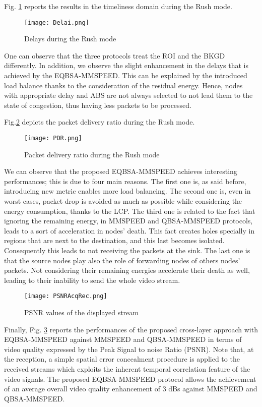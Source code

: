 \documentclass[conference,a4paper]{IEEEtran}
\begin{document}
Fig. \ref{D_RM} reports the results in the timeliness domain during the Rush mode. 
\begin{figure}[htb]
\centering \texttt{[image: Delai.png]}
\caption{Delays during the Rush mode}
\label{D_RM}
\end{figure}
One can observe that the three protocols treat the ROI and the BKGD differently. In addition, we observe the slight enhancement in the delays that is achieved by the EQBSA-MMSPEED. This can be explained by the introduced load balance thanks to the consideration of the residual energy. Hence, nodes with appropriate delay and ABS are not always selected to not lead them to the state of congestion, thus having less packets to be processed.  

Fig.\ref{PDR_RM} depicts the packet delivery ratio during the Rush mode.
\begin{figure}[htb]
\centering \texttt{[image: PDR.png]}
\caption{Packet delivery ratio during the Rush mode}
\label{PDR_RM}
\end{figure}
We can observe that the proposed EQBSA-MMSPEED achieves interesting performances; this is due to four main reasons. The first one is, as said before, introducing new metric enables more load balancing. The second one is, even in worst cases, packet drop is avoided as much as possible while considering the energy consumption, thanks to the LCP. The third one is related to the fact that ignoring the remaining energy, in MMSPEED and QBSA-MMSPEED protocols, leads to a sort of acceleration in nodes' death. This fact creates holes specially in regions that are next to the destination, and this last becomes isolated. Consequently this leads to not receiving the packets at the sink. The last one is that the source nodes play also the role of forwarding nodes of others nodes' packets. Not considering their remaining energies accelerate their death as well, leading to their inability to send the whole video stream.
\vspace{-0.5cm}
\begin{figure}[htb]
\hspace{-0.80cm}\texttt{[image: PSNRAcqRec.png]}
\caption{PSNR values of the displayed stream}
\label{PSNR}
\end{figure}

Finally, Fig. \ref{PSNR} reports the performances of the proposed cross-layer approach with EQBSA-MMSPEED against MMSPEED \cite{mmspeed} and QBSA-MMSPEED \cite{our} in terms of video quality expressed by the Peak Signal to noise Ratio (PSNR). Note that, at the reception, a simple spatial error concealment procedure is applied to the received streams which exploits the inherent temporal correlation feature of the video signals. The proposed EQBSA-MMSPEED protocol allows the achievement of an average overall video quality enhancement of 3 dBs against MMSPEED and QBSA-MMSPEED. 
\end{document}
